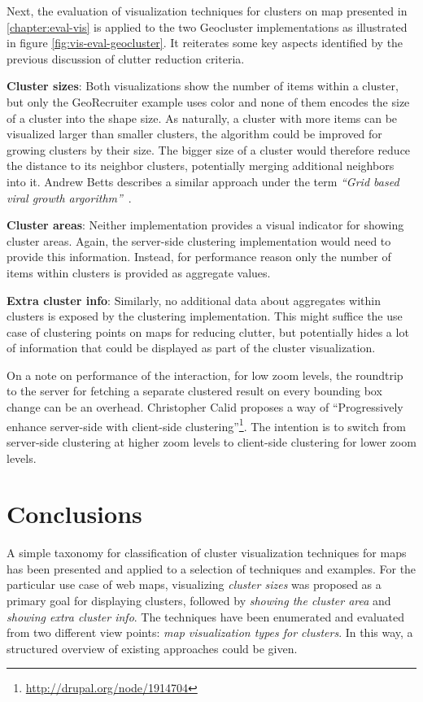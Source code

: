 Next, the evaluation of visualization techniques for clusters on map presented in \ref{chapter:eval-vis} is applied to the two Geocluster implementations as illustrated in figure \ref{fig:vis-eval-geocluster}. It reiterates some key aspects identified by the previous discussion of clutter reduction criteria.

\textbf{Cluster sizes}: Both visualizations show the number of items within a cluster, but only the GeoRecruiter example uses color and none of them encodes the size of a cluster into the shape size. As naturally, a cluster with more items can be visualized larger than smaller clusters, the algorithm could be improved for growing clusters by their size. The bigger size of a cluster would therefore reduce the distance to its neighbor clusters, potentially merging additional neighbors into it. Andrew Betts describes a similar approach under the term \textit{``Grid based viral growth argorithm''}~\cite{web:clustering-google}.

\textbf{Cluster areas}: Neither implementation provides a visual indicator for showing cluster areas. Again, the server-side clustering implementation would need to provide this information. Instead, for performance reason only the number of items within clusters is provided as aggregate values.

\textbf{Extra cluster info}: Similarly, no additional data about aggregates within clusters is exposed by the clustering implementation. This might suffice the use case of clustering points on maps for reducing clutter, but potentially hides a lot of information that could be displayed as part of the cluster visualization. 

On a note on performance of the interaction, for low zoom levels, the roundtrip to the server for fetching a separate clustered result on every bounding box change can be an overhead. Christopher Calid proposes a way of ``Progressively enhance server-side with client-side clustering''\footnote{\url{http://drupal.org/node/1914704}}. The intention is to switch from server-side clustering at higher zoom levels to client-side clustering for lower zoom levels.



\section{Conclusions}

A simple taxonomy for classification of cluster visualization techniques for maps has been presented and applied to a selection of techniques and examples. For the particular use case of web maps, visualizing \textit{cluster sizes} was proposed as a primary goal for displaying clusters, followed by \textit{showing the cluster area} and \textit{showing extra cluster info}. The techniques have been enumerated and evaluated from two different view points: \textit{map visualization types for clusters}. In this way, a structured overview of existing approaches could be given.

